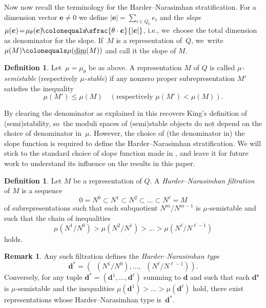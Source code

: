 \documentclass[JEP,XML,SOM,Unicode,NoEqCountersInSection,published]{cedram}
\theoremstyle{plain}
\theoremstyle{definition}
\newtheorem{definition}[theorem]{Definition}
\newtheorem{remark}[theorem]{Remark}
\DeclareMathOperator\dimvect{\underline{\operatorname{dim}}}
\newcommand\tuple[1]{\ensuremath{{\boldsymbol{#1}}}}
\begin{document}
Now now recall the terminology for the Harder--Narasimhan stratification.
For a dimension vector $\tuple{e} \!\neq\! 0$ we define $|\tuple{e}| \!=\! \sum_{i \in Q_0} e_i$
and the \emph{slope}~\hbox{$\mu(\tuple{e}) \!=\! \mu_\theta(\tuple{e}) \!\colonequals\! \sfrac{\theta\cdot\tuple{e}}{|\tuple{e}|}$},
i.e., we~choose the total dimension as denominator for the slope.
If~$M$ is a representation of~$Q$, we~write~$\mu(M)\colonequals\mu(\dimvect(M))$ and call it the slope of $M$.

\begin{definition}
Let~$\mu=\mu_\theta$ be as above.
A representation $M$ of $Q$ is called \emph{$\mu$\nobreakdash-semistable} (respectively \emph{$\mu$\nobreakdash-stable})
if any nonzero proper subrepresentation $M'$ satisfies the inequality
\begin{equation*}
\mu(M') \leq \mu(M) \quad(\text{respectively } \mu(M') < \mu(M)).
\end{equation*}
\end{definition}

By clearing the denominator as explained in \cite[Rem.\,2.3]{MR3199484}
this recovers King's definition of (semi)stability, so~the moduli spaces of (semi)stable objects do not depend on the choice of denominator in~$\mu$.
However, the choice of (the denominator in) the slope function
is required to define the Harder--Narasimhan stratification.
We will stick to the standard choice of slope function made in \cite{MR1974891},
and leave it for future work to understand its influence on the results in this paper.

\begin{definition}
Let $M$ be a representation of $Q$.
A \emph{Harder--Narasimhan filtration} of $M$ is a sequence
\begin{equation*}
0 = N^0 \subset N^1 \subset N^2 \subset \ldots \subset N^\ell = M
\end{equation*}
of subrepresentations such that each subquotient $N^m/N^{m-1}$ is $\mu$\nobreakdash-semistable
and such that the chain of inequalities
\begin{equation*}
\mu(N^1/N^0) > \mu(N^2/N^1) > \ldots > \mu(N^\ell/N^{\ell-1})
\end{equation*}
holds.
\end{definition}

\begin{remark}
Any such filtration defines the \emph{Harder--Narasimhan type}
\begin{equation*}
\tuple{d}^* = (\dimvect(N^1/N^0),\ldots,\dimvect(N^{\ell}/N^{\ell-1})).
\end{equation*}
Conversely, for any tuple
$\tuple{d}^* = (\tuple{d}^1,\ldots,\tuple{d}^{\ell})$ summing to $\tuple{d}$ and
such that each $\tuple{d^s}$ is $\mu$\nobreakdash-semistable and
the inequalities $\mu(\tuple{d}^1)>\ldots>\mu(\tuple{d}^{\ell})$ hold,
there exist representations whose Harder--Narasimhan type is~$\tuple{d}^*$.
\end{remark}
\end{document}
